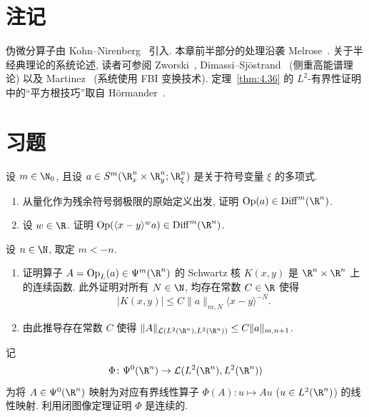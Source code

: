 \section*{注记}

伪微分算子由 Kohn--Nirenberg~\cite{KN65} 引入. 本章前半部分的处理沿袭 Melrose~\cite{Mel07}. 关于半经典理论的系统论述, 读者可参阅 Zworski~\cite{Zwo12}, Dimassi--Sjöstrand~\cite{DS99} (侧重高能谱理论) 以及 Martinez~\cite{Mar01} (系统使用 FBI 变换技术). 定理~\ref{thm:4.36} 的 $L^2$-有界性证明中的``平方根技巧''取自 Hörmander~\cite[定理 2.2.1]{Hor71a}.

\section*{习题}

\begin{exer}[关于 $\xi$ 为多项式的符号量化]\label{ex:4.1}
设 $m \in \N_0$, 且设 $a \in S^m(\R_x^n \times \R_y^n; \R_\xi^n)$ 是关于符号变量 $\xi$ 的多项式.
\begin{enumerate}
    \item 从量化作为残余符号弱极限的原始定义出发, 证明 $\Op(a) \in \Diff^m(\R^n)$.
    \item 设 $w \in \R$. 证明 $\Op(\langle x - y \rangle^w a) \in \Diff^m(\R^n)$.
\end{enumerate}
\end{exer}

\begin{exer}[极低阶伪微分算子的界]\label{ex:4.2}
设 $n \in \N$, 取定 $m < -n$.
\begin{enumerate}
    \item 证明算子 $A = \Op_L(a) \in \Psi^m(\R^n)$ 的 Schwartz 核 $K(x, y)$ 是 $\R^n \times \R^n$ 上的连续函数. 此外证明对所有 $N \in \N$, 均存在常数 $C \in \R$ 使得
    \begin{equation}\label{eq:4.158}
        |K(x, y)| \le C \|a\|_{m, N} \langle x - y \rangle^{-N}.
    \end{equation}
    \item 由此推导存在常数 $C$ 使得 $\|A\|_{\mathcal{L}(L^2(\R^n), L^2(\R^n))} \le C \|a\|_{m, n+1}$.
\end{enumerate}
\end{exer}

\begin{exer}\label{ex:4.3}
记
\begin{equation}\label{eq:4.159}
    \Phi \colon \Psi^0(\R^n) \to \mathcal{L}(L^2(\R^n), L^2(\R^n))
\end{equation}
为将 $A \in \Psi^0(\R^n)$ 映射为对应有界线性算子 $\Phi(A) \colon u \mapsto A u$ ($u \in L^2(\R^n)$) 的线性映射. 利用闭图像定理证明 $\Phi$ 是连续的.
\end{exer}

